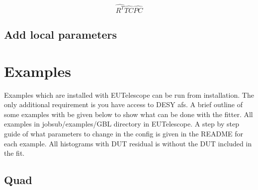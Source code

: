 \begin{equation}
\hat{R^{T}} \hat{TC} \hat{PC} 
\end{equation}

\subsection{Add local parameters}

\newpage

\section{Examples}

Examples which are installed with EUTelescope can be run from installation. The only additional requirement is you have access to DESY afs. A brief outline of some examples with be given below to show what can be done with the fitter. All examples in jobsub/examples/GBL directory in EUTelescope. A step by step guide of what parameters to change in the config is given in the README for each example. All histograms with DUT residual is without the DUT included in the fit.

\subsection{Quad}

